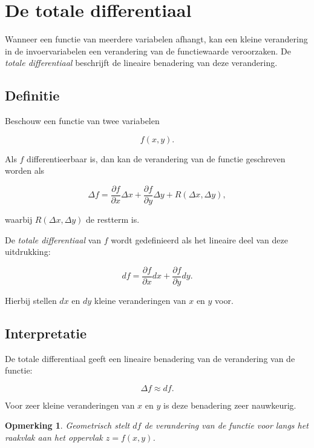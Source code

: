 \documentclass[11pt,a4paper]{article}
\newtheorem{remark}[theorem]{Opmerking}
\begin{document}
    \section{De totale differentiaal}

    Wanneer een functie van meerdere variabelen afhangt, kan een kleine verandering
    in de invoervariabelen een verandering van de functiewaarde veroorzaken. De
    \textit{totale differentiaal} beschrijft de lineaire benadering van deze verandering.

    \subsection{Definitie}

    Beschouw een functie van twee variabelen

    \[
        f(x,y).
    \]

    Als $f$ differentieerbaar is, dan kan de verandering van de functie geschreven
    worden als

    \[
        \Delta f
        =
        \frac{\partial f}{\partial x}\Delta x
        +
        \frac{\partial f}{\partial y}\Delta y
        +
        R(\Delta x,\Delta y),
    \]

    waarbij $R(\Delta x,\Delta y)$ de restterm is.

    De \textit{totale differentiaal} van $f$ wordt gedefinieerd als het lineaire
    deel van deze uitdrukking:

    \[
        df
        =
        \frac{\partial f}{\partial x}dx
        +
        \frac{\partial f}{\partial y}dy.
    \]

    Hierbij stellen $dx$ en $dy$ kleine veranderingen van $x$ en $y$ voor.

    \subsection{Interpretatie}

    De totale differentiaal geeft een lineaire benadering van de verandering
    van de functie:

    \[
        \Delta f \approx df.
    \]

    Voor zeer kleine veranderingen van $x$ en $y$ is deze benadering zeer nauwkeurig.

    \begin{remark}
        Geometrisch stelt $df$ de verandering van de functie voor langs het
        raakvlak aan het oppervlak $z=f(x,y)$.
    \end{remark}
\end{document}
